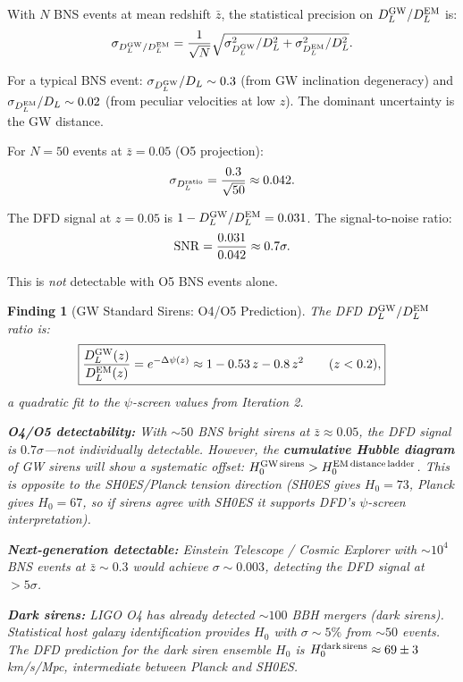 \documentclass[11pt]{article}
\newtheorem{finding}{Finding}
\begin{document}
With $N$ BNS events at mean redshift $\bar{z}$, the statistical precision on $D_L^{\rm GW}/D_L^{\rm EM}$ is:
\begin{equation}
\sigma_{D_L^{\rm GW}/D_L^{\rm EM}} = \frac{1}{\sqrt{N}}\sqrt{\sigma_{D_L^{\rm GW}}^2/D_L^2 + \sigma_{D_L^{\rm EM}}^2/D_L^2}.
\end{equation}

For a typical BNS event: $\sigma_{D_L^{\rm GW}}/D_L \sim 0.3$ (from GW inclination degeneracy) and $\sigma_{D_L^{\rm EM}}/D_L \sim 0.02$ (from peculiar velocities at low $z$). The dominant uncertainty is the GW distance.

For $N = 50$ events at $\bar{z} = 0.05$ (O5 projection):
\begin{equation}
\sigma_{D_L^{\rm ratio}} = \frac{0.3}{\sqrt{50}} \approx 0.042.
\end{equation}

The DFD signal at $z = 0.05$ is $1 - D_L^{\rm GW}/D_L^{\rm EM} = 0.031$. The signal-to-noise ratio:
\begin{equation}
{\rm SNR} = \frac{0.031}{0.042} \approx 0.7\sigma.
\end{equation}

This is \emph{not} detectable with O5 BNS events alone.

\begin{finding}[GW Standard Sirens: O4/O5 Prediction]
The DFD $D_L^{\rm GW}/D_L^{\rm EM}$ ratio is:
\begin{equation}\label{eq:sirens-refined}
\boxed{\frac{D_L^{\rm GW}(z)}{D_L^{\rm EM}(z)} = e^{-\Delta\psi(z)} \approx 1 - 0.53\,z - 0.8\,z^2 \qquad (z < 0.2),}
\end{equation}
a quadratic fit to the $\psi$-screen values from Iteration 2.

\textbf{O4/O5 detectability:} With $\sim 50$ BNS bright sirens at $\bar{z} \approx 0.05$, the DFD signal is $0.7\sigma$---not individually detectable. However, the \textbf{cumulative Hubble diagram} of GW sirens will show a systematic offset: $H_0^{\rm GW\,sirens} > H_0^{\rm EM\,distance\,ladder}$. This is \emph{opposite} to the SH0ES/Planck tension direction (SH0ES gives $H_0 = 73$, Planck gives $H_0 = 67$, so if sirens agree with SH0ES it supports DFD's $\psi$-screen interpretation).

\textbf{Next-generation detectable:} Einstein Telescope / Cosmic Explorer with $\sim 10^4$ BNS events at $\bar{z} \sim 0.3$ would achieve $\sigma \sim 0.003$, detecting the DFD signal at $>5\sigma$.

\textbf{Dark sirens:} LIGO O4 has already detected $\sim 100$ BBH mergers (dark sirens). Statistical host galaxy identification provides $H_0$ with $\sigma \sim 5\%$ from $\sim 50$ events. The DFD prediction for the dark siren ensemble $H_0$ is $H_0^{\rm dark\,sirens} \approx 69 \pm 3$ km/s/Mpc, intermediate between Planck and SH0ES.
\end{finding}
\end{document}
